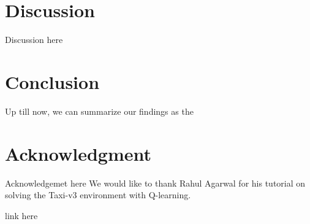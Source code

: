 \documentclass[conference]{IEEEtran}
\begin{document}
 

\section{Discussion}
Discussion here

\section{Conclusion}
Up till now, we can summarize our findings as the 



\section*{Acknowledgment}
Acknowledgemet here
We would like to thank Rahul Agarwal for his tutorial \cite{agarwal2020} on solving the Taxi-v3 environment with Q-learning.

\begin{thebibliography}{00}
 link here
\end{thebibliography}
\end{document}
